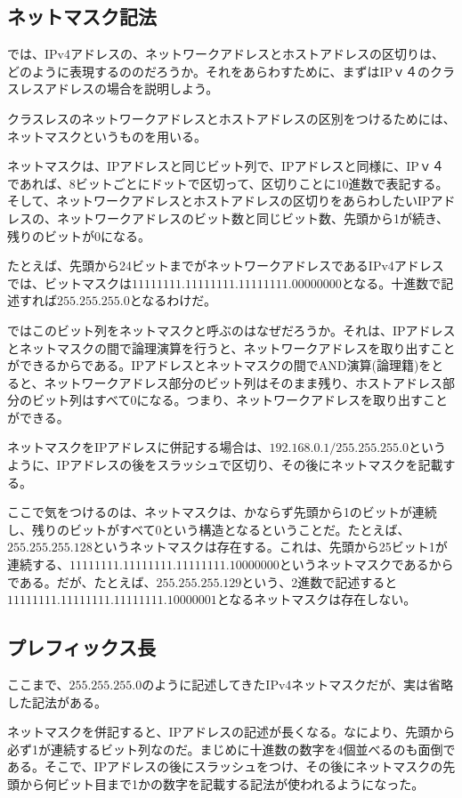 \subsection{ネットマスク記法}

では、IPv4アドレスの、ネットワークアドレスとホストアドレスの区切りは、どのように表現するののだろうか。それをあらわすために、まずはIPｖ４のクラスレスアドレスの場合を説明しよう。

クラスレスのネットワークアドレスとホストアドレスの区別をつけるためには、ネットマスクというものを用いる。

ネットマスクは、IPアドレスと同じビット列で、IPアドレスと同様に、IPｖ４であれば、8ビットごとにドットで区切って、区切りことに10進数で表記する。そして、ネットワークアドレスとホストアドレスの区切りをあらわしたいIPアドレスの、ネットワークアドレスのビット数と同じビット数、先頭から1が続き、残りのビットが0になる。

たとえば、先頭から24ビットまでがネットワークアドレスであるIPv4アドレスでは、ビットマスクは$11111111.11111111.11111111.00000000$となる。十進数で記述すれば$255.255.255.0$となるわけだ。

ではこのビット列をネットマスクと呼ぶのはなぜだろうか。それは、IPアドレスとネットマスクの間で論理演算を行うと、ネットワークアドレスを取り出すことができるからである。IPアドレスとネットマスクの間でAND演算(論理籍)をとると、ネットワークアドレス部分のビット列はそのまま残り、ホストアドレス部分のビット列はすべて0になる。つまり、ネットワークアドレスを取り出すことができる。

ネットマスクをIPアドレスに併記する場合は、$192.168.0.1/255.255.255.0$というように、IPアドレスの後をスラッシュで区切り、その後にネットマスクを記載する。

ここで気をつけるのは、ネットマスクは、かならず先頭から1のビットが連続し、残りのビットがすべて0という構造となるということだ。たとえば、$255.255.255.128$というネットマスクは存在する。これは、先頭から25ビット1が連続する、$11111111.11111111.11111111.10000000$というネットマスクであるからである。だが、たとえば、$255.255.255.129$という、2進数で記述すると$11111111.11111111.11111111.10000001$となるネットマスクは存在しない。


\subsection{プレフィックス長}

ここまで、$255.255.255.0$のように記述してきたIPv4ネットマスクだが、実は省略した記法がある。

ネットマスクを併記すると、IPアドレスの記述が長くなる。なにより、先頭から必ず1が連続するビット列なのだ。まじめに十進数の数字を4個並べるのも面倒である。そこで、IPアドレスの後にスラッシュをつけ、その後にネットマスクの先頭から何ビット目まで1かの数字を記載する記法が使われるようになった。

